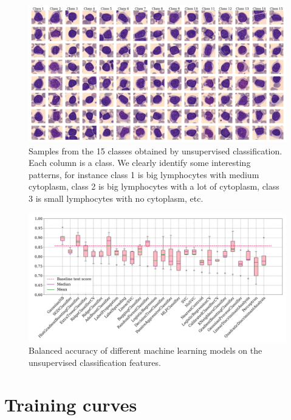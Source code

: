 \documentclass{midl}
\begin{document}
\begin{figure}[H]
    \centering
    \includegraphics[width=\textwidth]{figures/unsupervised_classification.png}
    \caption{Samples from the 15 classes obtained by unsupervised classification. Each column is a class. We clearly identify some interesting patterns, for instance class 1 is big lymphocytes with medium cytoplasm, class 2 is big lymphocytes with a lot of cytoplasm, class 3 is small lymphocytes with no cytoplasm, etc.}
    \label{fig:unsupervised_classification}
\end{figure}

\begin{figure}[H]
    \centering
    \includegraphics[width=\textwidth]{figures/unsupervised_classification_models.png}
    \caption{Balanced accuracy of different machine learning models on the unsupervised classification features.}
    \label{fig:unsupervised_classification_models}
\end{figure}

\section{Training curves}
\end{document}
